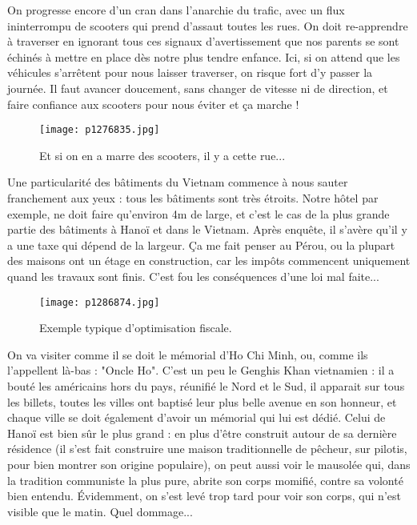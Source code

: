 \documentclass{book}
\begin{document}
On progresse encore d'un cran dans l'anarchie du trafic, avec un flux ininterrompu de scooters qui prend d'assaut toutes les rues. On doit re-apprendre à traverser en ignorant tous ces signaux d'avertissement que nos parents se sont échinés à mettre en place dès notre plus tendre enfance. Ici, si on attend que les véhicules s'arrêtent pour nous laisser traverser, on risque fort d'y passer la journée. Il faut avancer doucement, sans changer de vitesse ni de direction, et faire confiance aux scooters pour nous éviter et ça marche !


\begin{figure}[h]
\centering
\texttt{[image: p1276835.jpg]}
\caption*{Et si on en a marre des scooters, il y a cette rue...}
\end{figure}

Une particularité des bâtiments du Vietnam commence à nous sauter franchement aux yeux : tous les bâtiments sont très étroits. Notre hôtel par exemple, ne doit faire qu'environ 4m de large, et c'est le cas de la plus grande partie des bâtiments à Hanoï et dans le Vietnam. Après enquête, il s'avère qu'il y a une taxe qui dépend de la largeur. Ça me fait penser au Pérou, ou la plupart des maisons ont un étage en construction, car les impôts commencent uniquement quand les travaux sont finis. C'est fou les conséquences d'une loi mal faite...


\begin{figure}[h]
\centering
\texttt{[image: p1286874.jpg]}
\caption*{Exemple typique d'optimisation fiscale.}
\end{figure}

On va visiter comme il se doit le mémorial d'Ho Chi Minh, ou, comme ils l'appellent là-bas : "Oncle Ho". C'est un peu le Genghis Khan vietnamien : il a bouté les américains hors du pays, réunifié le Nord et le Sud, il apparait sur tous les billets, toutes les villes ont baptisé leur plus belle avenue en son honneur, et chaque ville se doit également d'avoir un mémorial qui lui est dédié. Celui de Hanoï est bien sûr le plus grand : en plus d'être construit autour de sa dernière résidence (il s'est fait construire une maison traditionnelle de pêcheur, sur pilotis, pour bien montrer son origine populaire), on peut aussi voir le mausolée qui, dans la tradition communiste la plus pure, abrite son corps momifié, contre sa volonté bien entendu. Évidemment, on s'est levé trop tard pour voir son corps, qui n'est visible que le matin. Quel dommage...
\end{document}
